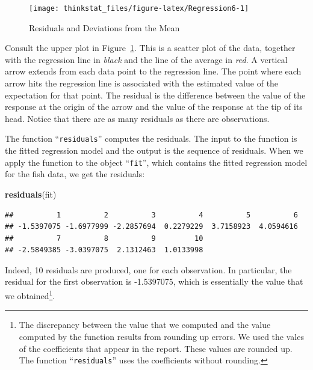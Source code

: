 \documentclass[]{krantz}
\makeatletter
\newenvironment{Shaded}{\begin{snugshade}}{\end{snugshade}}
\newcommand{\KeywordTok}[1]{\textcolor[rgb]{0.13,0.29,0.53}{\textbf{#1}}}
\newcommand{\NormalTok}[1]{#1}
\newenvironment{kframe}{%
\medskip{}
\setlength{\fboxsep}{.8em}
 \def\at@end@of@kframe{}%
 \ifinner\ifhmode%
  \def\at@end@of@kframe{\end{minipage}}%
  \begin{minipage}{\columnwidth}%
 \fi\fi%
 \def\FrameCommand##1{\hskip\@totalleftmargin \hskip-\fboxsep
 \colorbox{shadecolor}{##1}\hskip-\fboxsep
     \hskip-\linewidth \hskip-\@totalleftmargin \hskip\columnwidth}%
 \MakeFramed {\advance\hsize-\width
   \@totalleftmargin\z@ \linewidth\hsize
   \@setminipage}}%
 {\par\unskip\endMakeFramed%
 \at@end@of@kframe}
\renewenvironment{Shaded}{\begin{kframe}}{\end{kframe}}
\theoremstyle{definition}
\theoremstyle{definition}
\theoremstyle{definition}
\theoremstyle{remark}
\makeatother
\begin{document}
\begin{figure}

{\centering \texttt{[image: thinkstat\_files/figure-latex/Regression6-1]} 

}

\caption{Residuals and Deviations from the Mean}\label{fig:Regression6}
\end{figure}

Consult the upper plot in Figure~\ref{fig:Regression6}. This is a
scatter plot of the data, together with the regression line in
\emph{black} and the line of the average in \emph{red}. A vertical arrow
extends from each data point to the regression line. The point where
each arrow hits the regression line is associated with the estimated
value of the expectation for that point. The residual is the difference
between the value of the response at the origin of the arrow and the
value of the response at the tip of its head. Notice that there are as
many residuals as there are observations.

The function ``\texttt{residuals}'' computes the residuals. The input to
the function is the fitted regression model and the output is the
sequence of residuals. When we apply the function to the object
``\texttt{fit}'', which contains the fitted regression model for the
fish data, we get the residuals:

\begin{Shaded}
\begin{Highlighting}[]
\KeywordTok{residuals}\NormalTok{(fit)}
\end{Highlighting}
\end{Shaded}

\begin{verbatim}
##          1          2          3          4          5          6 
## -1.5397075 -1.6977999 -2.2857694  0.2279229  3.7158923  4.0594616 
##          7          8          9         10 
## -2.5849385 -3.0397075  2.1312463  1.0133998
\end{verbatim}

Indeed, 10 residuals are produced, one for each observation. In
particular, the residual for the first observation is -1.5397075, which
is essentially the value that we obtained\footnote{The discrepancy
  between the value that we computed and the value computed by the
  function results from rounding up errors. We used the vales of the
  coefficients that appear in the report. These values are rounded up.
  The function ``\texttt{residuals}'' uses the coefficients without
  rounding.}.
\end{document}
